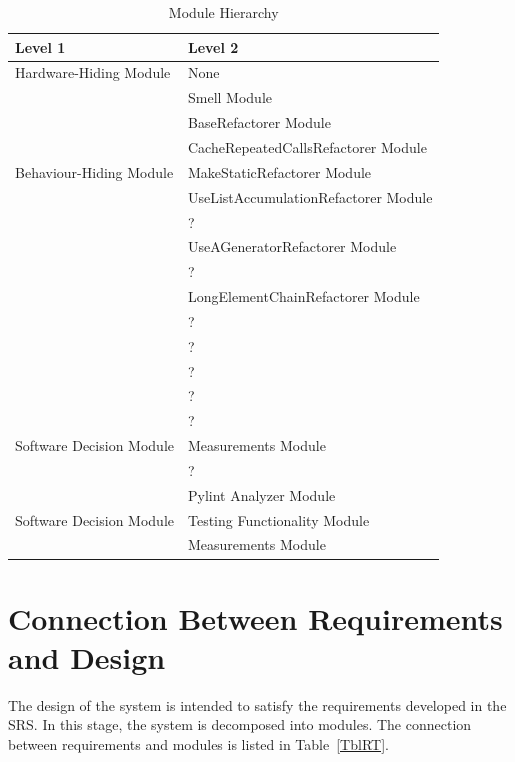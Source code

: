 \documentclass[12pt, titlepage]{article}
\begin{document}
\begin{table}[h!]
\centering
\begin{tabular}{p{} p{}}
\toprule
\textbf{Level 1} & \textbf{Level 2}\\
\midrule

{Hardware-Hiding Module} & None \\
\midrule

\multirow{7}{0.3\textwidth}{Behaviour-Hiding Module} & Smell Module\\
& BaseRefactorer Module\\
& CacheRepeatedCallsRefactorer Module\\
& MakeStaticRefactorer Module\\
& UseListAccumulationRefactorer Module\\
& ?\\
& UseAGeneratorRefactorer Module\\
& ?\\
& LongElementChainRefactorer Module\\
& ?\\
& ?\\
& ?\\ 
& ?\\
\midrule

\multirow{3}{0.3\textwidth}{Software Decision Module} & {?}\\
& Measurements Module\\
& ?\\
\multirow{3}{0.3\textwidth}{Software Decision Module} & Pylint Analyzer Module\\
& Testing Functionality Module\\
& Measurements Module\\
\bottomrule

\end{tabular}
\caption{Module Hierarchy}
\label{TblMH}
\end{table}

\section{Connection Between Requirements and Design} \label{SecConnection}

The design of the system is intended to satisfy the requirements developed in
the SRS. In this stage, the system is decomposed into modules. The connection
between requirements and modules is listed in Table~\ref{TblRT}.

\end{document}
